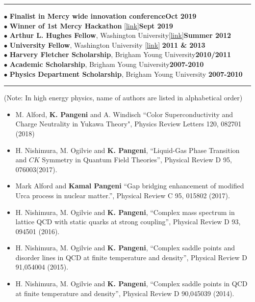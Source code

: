 \documentclass[10pt,letterpaper]{article}
\begin{document}
\hrule
{} 
$\bullet$ {\bf Finalist in Mercy wide innovation conference}\hfill{\bf Oct 2019}\\
$\bullet$ {\bf Winner of 1st Mercy Hackathon} [\href {https://www.linkedin.com/feed/update/urn:li:activity:6582628165401792512/}{link}]\hfill{\bf Sept 2019}\\
 $\bullet$ {\bf Arthur L. Hughes Fellow}, Washington University[\href{https://physics.wustl.edu/graduate#secondary}{link}]\hfill {\bf Summer 2012}\\
 $\bullet$ {\bf University Fellow}, Washington University [\href{https://physics.wustl.edu/graduate#secondary}{link}] \hfill {\bf 2011 \& 2013 }\\
 $\bullet$ {\bf Harvery Fletcher Scholarship}, Brigham Young University\hfill {\bf 2010/2011}\\
 $\bullet$ {\bf Academic Scholarship}, Brigham Young University\hfill{\bf 2007-2010}\\
 $\bullet$ {\bf Physics Department Scholarship}, Brigham Young University \hfill{\bf 2007-2010}\\

\hrule
{}
(Note: In high energy physics, name of authors are listed in alphabetical order)\\

\begin{itemize}
\item  M. Alford, \textbf{K. Pangeni} and A. Windisch ``Color Superconductivity and Charge Neutrality in Yukawa Theory", Physics Review Letters 120, 082701 (2018)
 \item H. Nishimura, M. Ogilvie and \textbf{K. Pangeni}, ``Liquid-Gas Phase Transition and $CK$ Symmetry in Quantum Field Theories'', Physical Review D 95, 076003(2017).
\item  Mark Alford and \textbf{Kamal Pangeni} ``Gap bridging enhancement of modified Urca process in nuclear matter.'', Physical Review C 95, 015802 (2017).
 \item H. Nishimura, M. Ogilvie and \textbf{K. Pangeni}, ``Complex mass spectrum in lattice QCD with static quarks at strong coupling'', Physical Review D 93, 094501 (2016).
 \item  H. Nishimura, M. Ogilvie and \textbf{K. Pangeni}, ``Complex saddle points and disorder lines in QCD at finite temperature and density'', Physical Review D 91,054004 (2015). 
 \item H. Nishimura, M. Ogilvie and \textbf{K. Pangeni}, ``Complex saddle points in QCD at finite temperature and density'', Physical Review D 90,045039 (2014). 
 \end{itemize}
\end{document}
